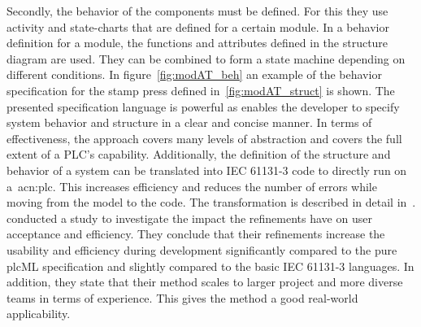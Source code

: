 Secondly, the behavior of the components must be defined.
For this they use activity and state-charts that are defined for a certain module.
In a behavior definition for a module, the functions and attributes defined in the structure diagram are used.
They can be combined to form a state machine depending on different conditions.
In figure~\ref{fig:modAT_beh} an example of the behavior specification for the stamp press defined in~\ref{fig:modAT_struct} is shown.
The presented specification language is powerful as enables the developer to specify system behavior and structure in a clear and concise manner.
In terms of effectiveness, the approach covers many levels of abstraction and covers the full extent of a PLC's capability.
Additionally, the definition of the structure and behavior of a system can be translated into IEC 61131-3 code to directly run on a~\acrshort{acn:plc}.
This increases efficiency and reduces the number of errors while moving from the model to the code.
The transformation is described in detail in~\cite{WITSCH2015}.
\citeauthor{Obermeier:2015aa} conducted a study to investigate the impact the refinements have on user acceptance and efficiency.
They conclude that their refinements increase the usability and efficiency during development significantly compared to the pure plcML specification and slightly compared to the basic IEC 61131-3 languages.
In addition, they state that their method scales to larger project and more diverse teams in terms of experience.
This gives the method a good real-world applicability.

